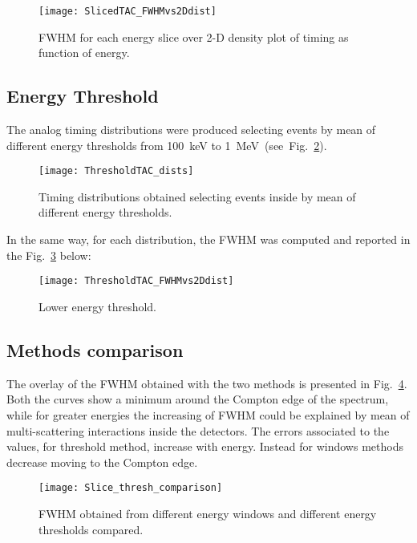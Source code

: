 \begin{figure}[h!]
	\centering
	\texttt{[image: SlicedTAC\_FWHMvs2Ddist]}
	\caption{FWHM for each energy slice over 2-D density plot of timing as function of energy. }
	\label{fig: energy windows analog}
\end{figure}
\newpage

\subsection*{Energy Threshold}
 The analog timing distributions were produced selecting events by mean of different energy thresholds from 100~keV to 1~MeV~(see~Fig.~\ref{Fig: lower energy thr}). 

\begin{figure}[H]
	\centering
	\texttt{[image: ThresholdTAC\_dists]}
	\caption{Timing distributions obtained selecting events inside by mean of different energy thresholds.}
	\label{Fig: lower energy thr}
\end{figure}
\newpage
In the same way, for each distribution, the FWHM was computed and reported in the Fig.~\ref{Fig:2Dplot_th} below:

\begin{figure}[H]
	\centering
	\texttt{[image: ThresholdTAC\_FWHMvs2Ddist]}
	\caption{Lower energy threshold.}
	\label{Fig:2Dplot_th}
\end{figure}

\subsection*{Methods  comparison}

The overlay of the FWHM obtained with the two methods is presented in Fig.~\ref{Fig:Slice_th_comp}. Both the curves show a minimum around the Compton edge of the spectrum, while for greater energies the increasing of FWHM could be explained by mean of multi-scattering interactions inside the detectors. The errors associated to the values, for threshold method, increase with energy. Instead for windows methods decrease moving to the Compton edge. %


\begin{figure}[H]
	\centering
	\texttt{[image: Slice\_thresh\_comparison]}
	\caption{FWHM obtained from different energy windows and different energy thresholds compared.}
	\label{Fig:Slice_th_comp}
\end{figure}










